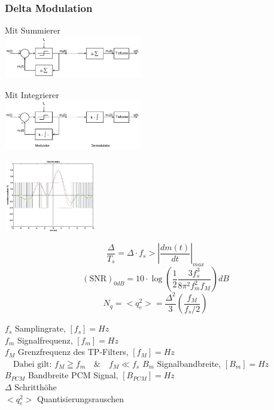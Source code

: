 \subsubsection{Delta Modulation }
\begin{minipage}{6cm}
	Mit Summierer\\
\includegraphics[width = 6cm]{bilder/dig_delta_modulator_schema_sum}
\end{minipage}
\hspace{0.5cm}
\begin{minipage}{6cm}
	Mit Integrierer\\
	\includegraphics[width = 6cm] {bilder/dig_delta_modulator_schema_int}
\end{minipage}
\hspace{0.5cm}
\begin{minipage}{4cm}
\includegraphics[width = 4cm] {bilder/dig_delta_modulation}
\end{minipage}

\begin{minipage}{9cm}
	\[\frac{\Delta}{T_s} = \Delta \cdot f_s > \left| \frac{d m(t)}{dt} \right|_{max}\]
	\[(\text{SNR})_{0dB} = 10 \cdot \log\left(\frac{1}{2}\frac{3 f_s^3}{8 \pi^2 f_m^2 f_M}\right) dB\]
	\[N_q = <q_e^2> = \frac{\Delta^2}{3}\left(\frac{f_M}{f_s/2} \right)\] 
\end{minipage}
\begin{minipage}{9cm}
	$f_s$ Samplingrate, $[f_s] = Hz$ \\
	$f_m$ Signalfrequenz, $[f_m] = Hz$ \\
	$f_M$ Grenzfrequenz des TP-Filters, $[f_M] = Hz$ \\
	$ \quad \text{Dabei gilt: }f_M \geqq f_m \quad \& \quad f_M \ll f_s$
	$B_m$ Signalbandbreite, $[B_m] = Hz $ \\
	$B_{PCM}$ Bandbreite PCM Signal, $[B_{PCM}] = Hz $\\
	$\Delta$ Schritthöhe\\
	$<q_e^2>$ Quantisierungsrauschen \\
\end{minipage}

